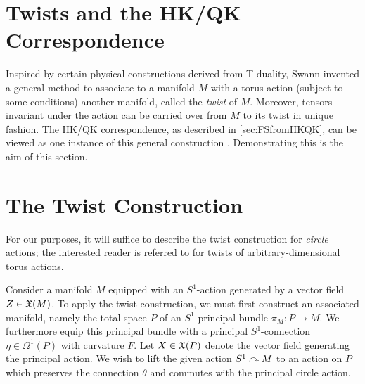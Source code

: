 \section{Twists and the HK/QK Correspondence}

Inspired by certain physical constructions derived from T-duality, Swann \cite{Swa2010} invented a general method to associate to a manifold $M$ with a torus action (subject to some conditions) another manifold, called the \emph{twist} of $M$. Moreover, tensors invariant under the action can be carried over from $M$ to its twist in unique fashion. The HK/QK correspondence, as described in \cref{sec:FSfromHKQK}, can be viewed as one instance of this general construction \cite{MS2014,MS2015}. Demonstrating this is the aim of this section.

\section{The Twist Construction}

For our purposes, it will suffice to describe the twist construction for \emph{circle} actions; the interested reader is referred to \cite{Swa2010} for twists of arbitrary-dimensional torus actions. 

Consider a manifold $M$ equipped with an $S^1$-action generated by a vector field $Z\in \mathfrak{X}(M)$. To apply the twist construction, we must first construct an associated manifold, namely the total space $P$ of an $S^1$-principal bundle $\pi_M:P\to M$. We furthermore equip this principal bundle with a principal $S^1$-connection $\eta\in \Omega^1(P)$ with curvature $F$. Let $X\in \mathfrak{X}(P)$ denote the vector field generating the principal action. We wish to lift the given action $S^1\curvearrowright M$ to an action on $P$ which preserves the connection $\theta$ and commutes with the principal circle action.

